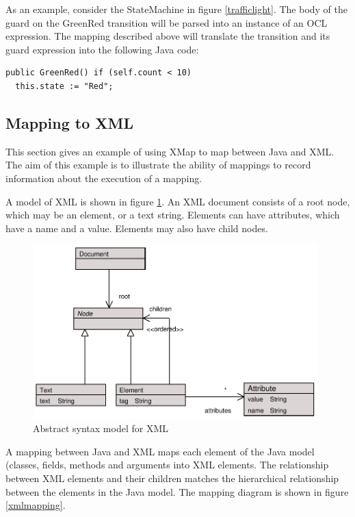As an example, consider the StateMachine in figure
\ref{trafficlight}. The body of the guard on the GreenRed
transition will be parsed into an instance of an OCL expression.
The mapping described above will translate the transition and its
guard expression into the following Java code:

\begin{lstlisting}
public GreenRed() if (self.count < 10)
  this.state := "Red";
\end{lstlisting}\subsection{Mapping to XML}

This section gives an example of using XMap to map between Java
and XML. The aim of this example is to illustrate the ability of
mappings to record information about the execution of a mapping.

A model of XML is shown in figure \ref{xmlmodel}. An XML document
consists of a root node, which may be an element, or a text
string. Elements can have attributes, which have a name and a
value. Elements may also have child nodes.

\begin{figure}[htb]
\begin{center}
\includegraphics[width=11cm]{Mappings/figures/xmlmodel.pdf}
\caption{Abstract syntax model for XML} \label{xmlmodel}
\end{center}
\end{figure}

A mapping between Java and XML maps each element of the Java model
(classes, fields, methods and arguments into XML elements. The
relationship between XML elements and their children matches the
hierarchical relationship between the elements in the Java model.
The mapping diagram is shown in figure \ref{xmlmapping}.

